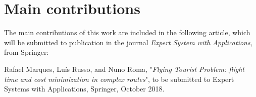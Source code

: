 \section{Main contributions}


The main contributions of this work are included in the following article, which will be submitted to publication in the journal \textit{Expert System with Applications}, from Springer:

Rafael Marques, Luís Russo, and Nuno Roma, "\textit{Flying Tourist Problem: flight time and cost minimization in complex routes}", to be submitted to Expert Systems with Applications, Springer, October 2018.
